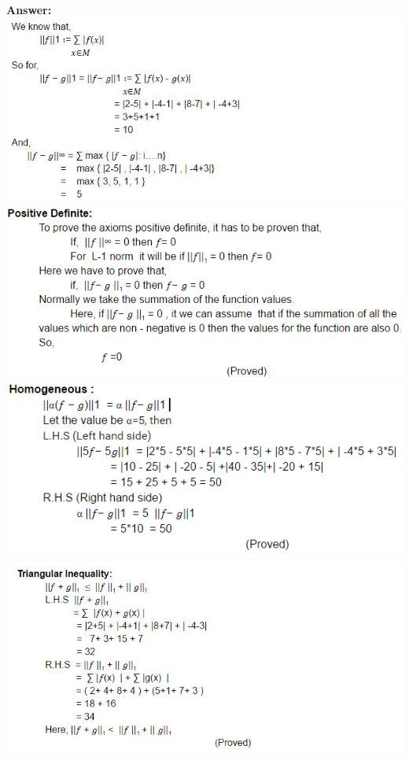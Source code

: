 \documentclass{WeSTassignment}
\begin{document}
\textbf{Answer:} \\
\includegraphics[width=1\textwidth]{1_new1.png}
\includegraphics[width=1\textwidth]{2.png}
\includegraphics[width=1\textwidth]{3.png}
\includegraphics[width=1\textwidth]{4_new.png}
\end{document}
